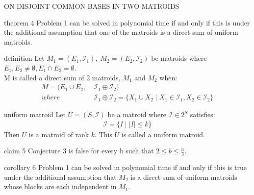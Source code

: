 \documentclass[11pt,xcolor=dvipsnames,table,dvipdfmx]{beamer}
\begin{document}
\begin{frame}{ON DISJOINT COMMON BASES IN TWO MATROIDS}
 \begin{block}{theorem 4}
  Problem 1 can be solved in polynomial time if and only if this is under the additional assumption that one of the matroids is a direct sum of uniform matroids.
 \end{block}
 \begin{block}{definition}
  Let $M_1 = (E_1, \mathcal{I}_1),\; M_2 = (E_2, \mathcal{I}_2)$ be matroids where $E_1 , E_2 \neq \emptyset , E_1 \cap E_2 = \emptyset$.\\
  M is called a \alert{direct sum} of 2 matroids, $M_1$ and $M_2$ when:
  \begin{align*}
   M = (E_1 \cup E_2 ,\; &\mathcal{I}_1 \oplus \mathcal{I}_2) \\
   where\; &\mathcal{I}_1 \oplus \mathcal{I}_2 = \{X_1 \cup X_2\; |\; X_1 \in \mathcal{I}_1, X_2 \in \mathcal{I}_2\}
  \end{align*}
 \end{block}
\end{frame}

\begin{frame}
 \begin{exampleblock}{uniform matroid}
  Let $U = (S, \mathcal{I})$ be a matroid where $\mathcal{I} \in 2^S$ satisfies:
  \begin{align*}
   \mathcal{I} = \{I\;|\;|I| \leq k\}
  \end{align*}
  Then $U$ is a matroid of rank $k$. This $U$ is called a \alert{uniform matroid}.
 \end{exampleblock}
\end{frame}

\begin{frame}
 \begin{block}{claim 5}
  Conjecture 3 is false for every b such that $2 \leq b \leq \frac{n}{3}$.
 \end{block}
 \begin{block}{corollary 6}
  Problem 1 can be solved in polynomial time if and only if this is true under the additional assumption that $M_2$ is a direct sum of uniform matroids whose blocks are each independent in $M_1$.
 \end{block}
\end{frame}
\end{document}
